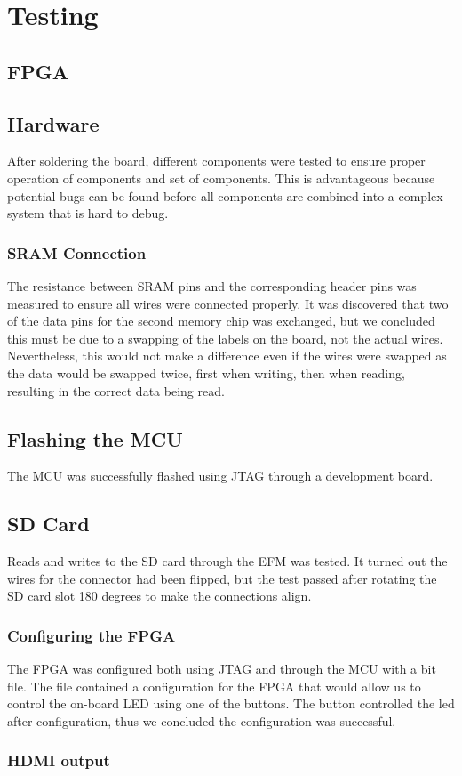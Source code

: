 \section{Testing}


\subsection{FPGA}


\subsection{Hardware}
After soldering the board, different components were tested to ensure proper operation of components and set of components.
This is advantageous because potential bugs can be found before all components are combined into a complex system that is hard to debug.

\subsubsection{SRAM Connection}
The resistance between SRAM pins and the corresponding header pins was measured to ensure all wires were connected properly.
It was discovered that two of the data pins for the second memory chip was exchanged, but we concluded this must be due to a swapping of the labels on the board, not the actual wires.
Nevertheless, this would not make a difference even if the wires were swapped as the data would be swapped twice, first when writing, then when reading, resulting in the correct data being read.

\subsection{Flashing the MCU}
The MCU was successfully flashed using JTAG through a development board.

\subsection{SD Card}
Reads and writes to the SD card through the EFM was tested. It turned out the wires for the connector had been flipped, but the test passed after rotating the SD card slot 180 degrees to make the connections align.

\subsubsection{Configuring the FPGA}
The FPGA was configured both using JTAG and through the MCU with a bit file. The file contained a configuration for the FPGA that would allow us to control the on-board LED using one of the buttons. The button controlled the led after configuration, thus we concluded the configuration was successful.

\subsubsection{HDMI output}
